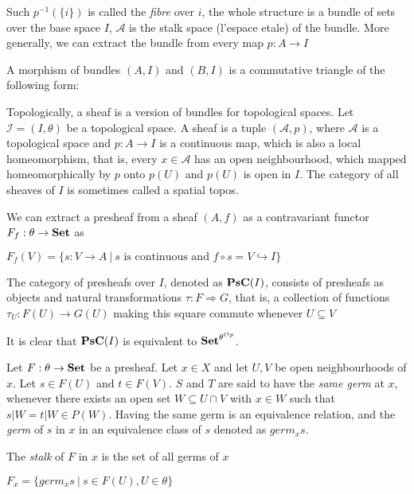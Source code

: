 \documentclass[a4paper]{article}
\theoremstyle{defin}
\theoremstyle{theorem}
\theoremstyle{claim}
\theoremstyle{prop}
\theoremstyle{lemma}
\theoremstyle{fact}
\theoremstyle{ex}
\theoremstyle{col}
\begin{document}
Such $p^{-1}(\{ i \})$ is called the \emph{fibre} over $i$, the whole structure is a bundle of sets over the base space $I$, $\mathcal{A}$ is the stalk space (l'espace etale) of the bundle. More generally, we can extract the bundle from every map $p : A \to I$

A morphism of bundles $(A, I)$ and $(B, I)$ is a commutative triangle of the following form:


Topologically, a sheaf is a version of bundles for topological spaces. Let $\mathcal{I} = (I, \theta)$ be a topological space. A sheaf is a tuple $(\mathcal{A}, p)$, where $\mathcal{A}$ is a topological space and $p : A \to I$ is a continuous map, which is also a local homeomorphism, that is, every $x \in \mathcal{A}$ has an open neighbourhood, which mapped homeomorphically by $p$ onto $p(U)$ and $p(U)$ is open in $I$. The category of all sheaves of $I$ is sometimes called a spatial topos.

We can extract a presheaf from a sheaf $(A, f)$ as a contravariant functor $F_f : \theta \to {\bf Set}$ as
\begin{center}
$F_f(V) = \{ s : V \to A \: | \: \text{$s$ is continuous and $f \circ s = V \hookrightarrow I $}\}$
\end{center}

The category of presheafs over $I$, denoted as ${\bf PsC}(I)$, consists of presheafs as objects and natural transformations $\tau : F \Rightarrow G$, that is, a collection of functions $\tau_U : F(U) \to G(U)$ making this square commute whenever $U \subseteq V$


It is clear that ${\bf PsC}(I)$ is equivalent to ${\bf Set}^{\theta^{Op}}$.

Let $F : \theta \to {\bf Set}$ be a presheaf. Let $x \in X$ and let $U, V$ be open neighbourhoods of $x$.
Let $s \in F(U)$ and $t \in F(V)$. $S$ and $T$ are said to have the \emph{same germ} at $x$, whenever there exists an open set $W \subseteq U \cap V$ with $x \in W$ such that $s|W = t|W \in P(W)$. Having the same germ is an equivalence relation, and the \emph{germ} of $s$ in $x$ in an equivalence class of $s$ denoted as $germ_x s$.

The \emph{stalk} of $F$ in $x$ is the set of all germs of $x$
\begin{center}
$F_x = \{ germ_x s \: | \: s \in F(U), U \in \theta \}$
\end{center}
\end{document}

